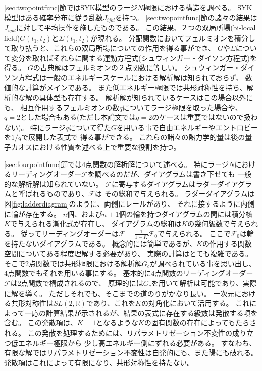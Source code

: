 \ref{sec:twopointfunc}節ではSYK模型のラージ$N$極限における構造を調べる。
SYK模型はある確率分布に従う乱数$J_{ijkl}$を持つ。
\ref{sec:twopointfunc}節の諸々の結果は$J_{ijkl}$に対して平均操作を施したものである。
この結果、２つの双局所場(bi-local field)$G(t_1, t_2)$と$\Sigma(t_1, t_2)$が現れる。
分配関数においてフェルミオンを積分して取り払うと、これらの双局所場についての作用を得る事ができ、
$G$や$\Sigma$について変分を取ればそれらに関する運動方程式(シュウィンガー・ダイソン方程式)を得る。
$G$の古典解はフェルミオンの２点関数に等しい。
シュウィンガー・ダイソン方程式は一般のエネルギースケールにおける解析解は知られておらず、
数値的な計算がメインである。
また低エネルギー極限では共形対称性を持ち、解析的な解の具体型も存在する。
解析解が知られているケースはこの場合以外にも、
相互作用するフェルミオンの数$q$についてラージ極限を取った場合や、
$q=2$とした場合もある(ただし本論文では$q=2$のケースは重要ではないので扱わない)。
特にラージ$q$について得た$G$を用いる事で自由エネルギーやエントロピーを$1/q$で展開した表式で
得る事ができる。
これらの諸々の熱力学的量は後の量子カオスにおける性質を述べる上で重要な役割を持つ。

\ref{sec:fourpointfunc}節では4点関数の解析解について述べる。
特にラージ$N$におけるリーディングオーダー$\mathcal{F}$を調べるのだが、ダイアグラムは書き下せても
一般的な解析解は知られていない。
$\mathcal{F}$に寄与するダイアグラムはラダーダイアグラムと呼ばれるものであり、$\mathcal{F}$は
その総和で与えられる。
ラダーダイアグラムは図\ref{fig:ladderdiagram}のように、両側にレールがあり、
それに接するように内側に輪が存在する。
$n$個、および$n+1$個の輪を持つダイアグラムの間には積分核$K$で与えられる漸化式が存在し、
ダイアグラムの総和は$K$の幾何級数で与えられる。
従ってリーディングオーダーは$\mathcal{F} = \frac{1}{1-K}\mathcal{F}_0$で与えられる。
ここで$\mathcal{F}_0$は輪を持たないダイアグラムである。
概念的には簡単であるが、$K$の作用する関数空間についてある程度理解する必要があり、
実際の計算はとても複雑である。
そこで2点関数では共形極限における解析解$G_c$が調べられている事を思い出し、
4点関数でもそれを用いる事にする。
基本的に4点関数のリーディングオーダー$\mathcal{F}$は2点関数で構成されるので、
原理的には$G_c$を用いて解析は可能であり、実際に解を導く。
ただしそれでも、そこまでの道のりがかなり長い。
一次元における共形対称性は$SL(2, \mathbb{R})$であり、これを$K$の対角化において活用する。
これによって一応の計算結果が示されるが、結果の表式に存在する級数は発散する項を含む。
この発散項は、$K = 1$となるような$K$の固有関数の存在によってもたらされる。
この発散を処理するためには、リパラメトリゼーション不変性の成り立つ低エネルギー極限から
少し高エネルギー側にずれる必要がある。
すなわち、有限な解ではリパラメトリゼーション不変性は自発的にも、また陽にも破れる。
発散項はこれによって有限になり、共形対称性を持たない。


\pagebreak

